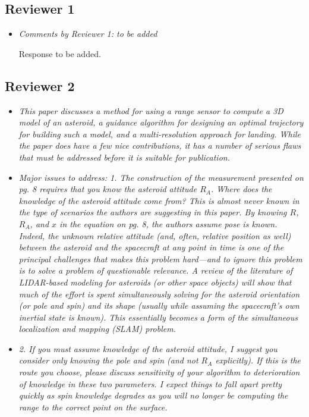 \documentclass[11pt]{article}
\newcommand{\comment}[1]{\item \itshape #1 \normalfont}
\begin{document}
\clearpage\newpage
\subsection*{Reviewer 1}
\begin{itemize}\setlength{\itemsep}{2\parsep}
    \comment{Comments by Reviewer 1: to be added}

    Response to be added.
\end{itemize}

\clearpage\newpage
\subsection*{Reviewer 2}

\begin{itemize}\setlength{\itemsep}{2\parsep}

\comment{This paper discusses a method for using a range sensor to compute a 3D model of an asteroid, a guidance algorithm for designing an optimal trajectory for building such a model, and a multi-resolution approach for landing. While the paper does have a few nice contributions, it has a number of serious flaws that must be addressed before it is suitable for publication.}

\comment{
Major issues to address:
1.      The construction of the measurement presented on pg. 8 requires that you know the asteroid attitude $R_A$. Where does the knowledge of the asteroid attitude come from? This is almost never known in the type of scenarios the authors are suggesting in this paper. By knowing $R$, $R_A$, and $x$ in the equation on pg. 8, the authors assume pose is known. Indeed, the unknown relative attitude (and, often, relative position as well) between the asteroid and the spacecraft at any point in time is one of the principal challenges that makes this problem hard---and to ignore this problem is to solve a problem of questionable relevance. A review of the literature of LIDAR-based modeling for asteroids (or other space objects) will show that much of the effort is spent simultaneously solving for the asteroid orientation (or pole and spin) and its shape (usually while assuming the spacecraft’s own inertial state is known). This essentially becomes a form of the simultaneous localization and mapping (SLAM) problem.}


\comment{2.      If you must assume knowledge of the asteroid attitude, I suggest you consider only knowing the pole and spin (and not $R_A$ explicitly). If this is the route you choose, please discuss sensitivity of your algorithm to deterioration of knowledge in these two parameters. I expect things to fall apart pretty quickly as spin knowledge degrades as you will no longer be computing the range to the correct point on the surface.}




\end{itemize}
\end{document}
